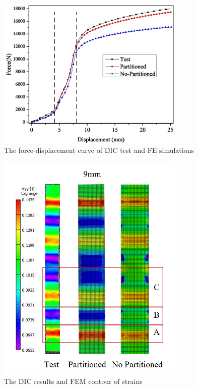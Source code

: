 \documentclass[review]{elsarticle}
\begin{document}
\begin{figure}[h!]
\centering
\includegraphics[width=0.8\textwidth]{./figs/DICverify.png}
\caption{The force-displacement curve of DIC test and FE simulations}
\label{fig:verify}
\end{figure}

\begin{figure}[h!]
\centering
\includegraphics[width=0.8\textwidth]{figs/DIC_FEM_modified.png}
\caption{The DIC results and FEM contour of strains}
\label{fig:DICresults}
\end{figure}
\end{document}

